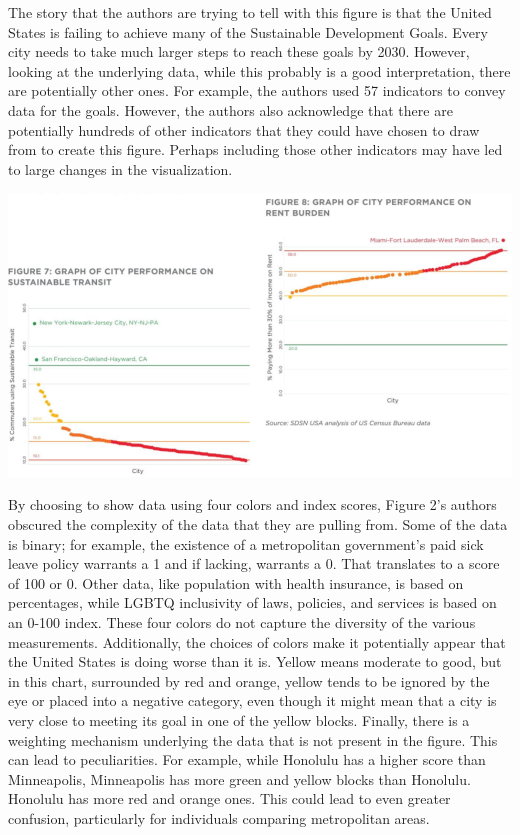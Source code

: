 \documentclass[]{article}
\begin{document}
The story that the authors are trying to tell with this figure is that
the United States is failing to achieve many of the Sustainable
Development Goals. Every city needs to take much larger steps to reach
these goals by 2030. However, looking at the underlying data, while this
probably is a good interpretation, there are potentially other ones. For
example, the authors used 57 indicators to convey data for the goals.
However, the authors also acknowledge that there are potentially
hundreds of other indicators that they could have chosen to draw from to
create this figure. Perhaps including those other indicators may have
led to large changes in the visualization.

\includegraphics[width=\textwidth,height=\textheight]{cutaway}

By choosing to show data using four colors and index scores, Figure 2's
authors obscured the complexity of the data that they are pulling from.
Some of the data is binary; for example, the existence of a metropolitan
government's paid sick leave policy warrants a 1 and if lacking,
warrants a 0. That translates to a score of 100 or 0. Other data, like
population with health insurance, is based on percentages, while LGBTQ
inclusivity of laws, policies, and services is based on an 0-100 index.
These four colors do not capture the diversity of the various
measurements. Additionally, the choices of colors make it potentially
appear that the United States is doing worse than it is. Yellow means
moderate to good, but in this chart, surrounded by red and orange,
yellow tends to be ignored by the eye or placed into a negative
category, even though it might mean that a city is very close to meeting
its goal in one of the yellow blocks. Finally, there is a weighting
mechanism underlying the data that is not present in the figure. This
can lead to peculiarities. For example, while Honolulu has a higher
score than Minneapolis, Minneapolis has more green and yellow blocks
than Honolulu. Honolulu has more red and orange ones. This could lead to
even greater confusion, particularly for individuals comparing
metropolitan areas.
\end{document}
